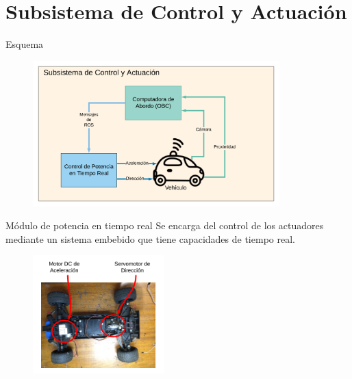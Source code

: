 \documentclass[10pt]{beamer}
\begin{document}
\section{Subsistema de Control y Actuación}
\begin{frame}{Esquema}
    \begin{figure}[!h] 
        \centering
        \includegraphics[width=0.85\textwidth]{../img/control_esq}
        \end{figure}
\end{frame}

    

\begin{frame}{Módulo de potencia en tiempo real}
    Se encarga del control de los actuadores mediante un sistema embebido 
    que tiene capacidades de tiempo real.

    \begin{figure}[!h] 
        \centering
        \includegraphics[width=0.45\textwidth]{../img/actuadores}
        \end{figure}
\end{frame}
\end{document}
